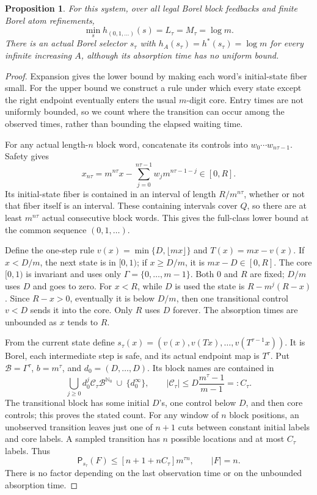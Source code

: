 \documentclass[11pt,reqno]{amsart}
\numberwithin{equation}{section}
\newtheorem{proposition}[theorem]{Proposition}
\theoremstyle{definition}
\theoremstyle{definition}
\newcommand{\Nzero}{\mathbb N_0}
\newcommand{\Patt}{\mathsf P}
\begin{document}
\begin{proposition}\label{prop:integer}
For this system, over all legal Borel block feedbacks and finite
Borel atom refinements,
\[
 \min_s h_{(0,1,\ldots)}(s)=L_\tau=M_\tau=\log m.
\]
There is an actual Borel selector $s_\tau$ with
$h_A(s_\tau)=h^*(s_\tau)=\log m$ for every infinite increasing
$A$, although its absorption time has no uniform bound.
\end{proposition}
\begin{proof}
Expansion gives the lower bound by making each word's initial-state
fiber small. For the upper bound we construct a rule under which
every state except the right endpoint eventually enters the usual
$m$-digit core. Entry times are not uniformly bounded,
so we count where the transition can occur among the observed times,
rather than bounding the elapsed waiting time.

For any actual length-$n$ block word, concatenate its controls into
$w_0\cdots w_{n\tau-1}$. Safety gives
\[
 x_{n\tau}=m^{n\tau}x-\sum_{j=0}^{n\tau-1}
                   w_jm^{n\tau-1-j}\in[0,R].
\]
Its initial-state fiber is contained in an interval of length
$R/m^{n\tau}$, whether or not that fiber itself is an interval.
These containing intervals cover $Q$, so there are at least
$m^{n\tau}$ actual consecutive block words. This gives the
full-class lower bound at the common sequence $(0,1,\ldots)$.

Define the one-step rule $v(x)=\min\{D,\lfloor mx\rfloor\}$
and $T(x)=mx-v(x)$. If $x<D/m$, the next state is in $[0,1)$;
if $x\ge D/m$, it is $mx-D\in[0,R]$.
The core $[0,1)$ is invariant and uses only
$\Gamma=\{0,\ldots,m-1\}$. Both $0$ and $R$ are fixed;
$D/m$ uses $D$ and goes to zero.
For $x<R$, while $D$ is used the state is
$R-m^j(R-x)$. Since $R-x>0$, eventually it is below $D/m$,
then one transitional control $v<D$ sends it into the core.
Only $R$ uses $D$ forever. The absorption times are unbounded
as $x$ tends to $R$.

From the current state define
$s_\tau(x)=(v(x),v(Tx),\ldots,v(T^{\tau-1}x))$.
It is Borel, each intermediate step is safe, and its actual endpoint
map is $T^\tau$. Put $\mathcal B=\Gamma^\tau$,
$b=m^\tau$, and $d_0=(D,\ldots,D)$.
Its block names are contained in
\[
 \bigcup_{j\ge0}d_0^j\mathcal C_\tau\mathcal B^{\Nzero}
 \ \cup\ \{d_0^\infty\},\qquad
 |\mathcal C_\tau|\le D\frac{m^\tau-1}{m-1}=:C_\tau.
\]
The transitional block has some initial $D$'s, one control below
$D$, and then core controls; this proves the stated count.
For any window of $n$ block positions, an unobserved transition
leaves just one of $n+1$ cuts between constant initial labels and
core labels. A sampled transition has $n$ possible locations and
at most $C_\tau$ labels. Thus
\[
 \Patt_{s_\tau}(F)\le[n+1+nC_\tau]m^{\tau n},\qquad |F|=n.
\]
There is no factor depending on the last observation time or on
the unbounded absorption time.


\end{proof}
\end{document}
